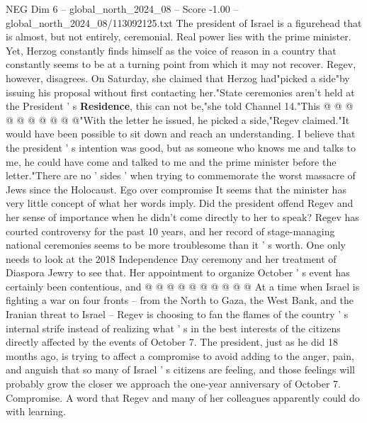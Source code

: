 \begin{textsample}{NEG Dim 6 – global\_north\_2024\_08 – Score -1.00 – global\_north\_2024\_08/113092125.txt}
The president of Israel is a figurehead that is almost, but not entirely, ceremonial.
Real power lies with the prime minister.
Yet, Herzog constantly finds himself as the voice of reason in a country that constantly seems to be at a turning point from which it may not recover.
Regev, however, disagrees.
On Saturday, she claimed that Herzog had"picked a side"by issuing his proposal without first contacting her."State ceremonies aren't held at the President ' s \textbf{Residence}, this can not be,"she told Channel 14."This @ @ @ @ @ @ @ @ @ @"With the letter he issued, he picked a side,"Regev claimed."It would have been possible to sit down and reach an understanding.
I believe that the president ' s intention was good, but as someone who knows me and talks to me, he could have come and talked to me and the prime minister before the letter."There are no ' sides ' when trying to commemorate the worst massacre of Jews since the Holocaust.
Ego over compromise It seems that the minister has very little concept of what her words imply.
Did the president offend Regev and her sense of importance when he didn't come directly to her to speak?
Regev has courted controversy for the past 10 years, and her record of stage-managing national ceremonies seems to be more troublesome than it ' s worth.
One only needs to look at the 2018 Independence Day ceremony and her treatment of Diaspora Jewry to see that.
Her appointment to organize October ' s event has certainly been contentious, and @ @ @ @ @ @ @ @ @ @ At a time when Israel is fighting a war on four fronts -- from the North to Gaza, the West Bank, and the Iranian threat to Israel -- Regev is choosing to fan the flames of the country ' s internal strife instead of realizing what ' s in the best interests of the citizens directly affected by the events of October 7.
The president, just as he did 18 months ago, is trying to affect a compromise to avoid adding to the anger, pain, and anguish that so many of Israel ' s citizens are feeling, and those feelings will probably grow the closer we approach the one-year anniversary of October 7.
Compromise.
A word that Regev and many of her colleagues apparently could do with learning.

\end{textsample}
